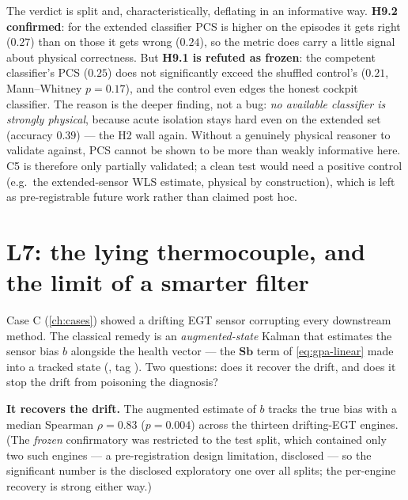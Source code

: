 \begin{table}[htbp]
  \centering\small
  \caption{L9 PCS validation: isolation accuracy and mean PCS for a competent, a confused,
  and a label-shuffled classifier. Auto-generated.}
  \label{tab:pcs}
  
\end{table}

The verdict is split and, characteristically, deflating in an informative way.
\textbf{H9.2 confirmed}: for the extended classifier PCS is higher on the episodes it gets
right ($0.27$) than on those it gets wrong ($0.24$), so the metric does carry a little
signal about physical correctness. But \textbf{H9.1 is refuted as frozen}: the competent
classifier's PCS ($0.25$) does not significantly exceed the shuffled control's ($0.21$,
Mann--Whitney $p = 0.17$), and the control even edges the honest cockpit classifier. The
reason is the deeper finding, not a bug: \emph{no available classifier is strongly physical},
because acute isolation stays hard even on the extended set (accuracy $0.39$) --- the H2 wall
again. Without a genuinely physical reasoner to validate against, PCS cannot be shown to be
more than weakly informative here. C5 is therefore only partially validated; a clean test
would need a positive control (e.g.\ the extended-sensor WLS estimate, physical by
construction), which is left as pre-registrable future work rather than claimed post hoc.

\section{L7: the lying thermocouple, and the limit of a smarter filter}
\label{sec:f8-l7}

Case C (\cref{ch:cases}) showed a drifting EGT sensor corrupting every downstream method. The
classical remedy is an \emph{augmented-state} Kalman that estimates the sensor bias $b$
alongside the health vector --- the $\mathbf{S}\mathbf{b}$ term of \cref{eq:gpa-linear} made
into a tracked state (, tag ). Two questions: does it
recover the drift, and does it stop the drift from poisoning the diagnosis?

\textbf{It recovers the drift.} The augmented estimate of $b$ tracks the true bias with a
median Spearman $\rho = 0.83$ ($p = 0.004$) across the thirteen drifting-EGT engines. (The
\emph{frozen} confirmatory was restricted to the test split, which contained only two such
engines --- a pre-registration design limitation, disclosed --- so the significant number is
the disclosed exploratory one over all splits; the per-engine recovery is strong either way.)

